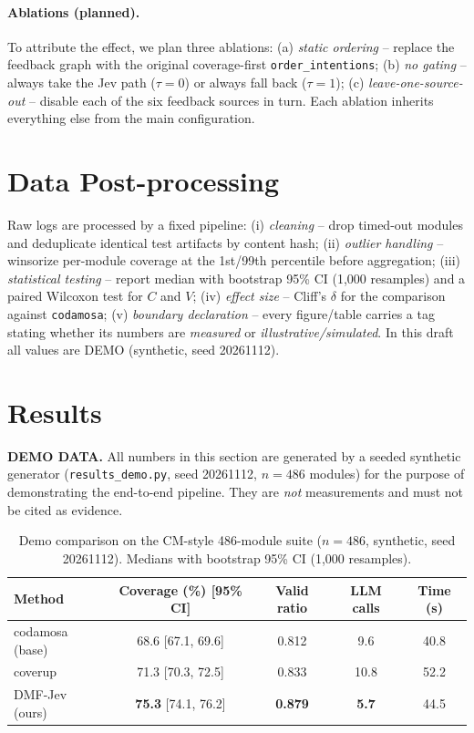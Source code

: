 \documentclass[11pt]{article}
\begin{document}
\paragraph{Ablations (planned).}
To attribute the effect, we plan three ablations: (a) \emph{static ordering} -- replace the feedback graph with the original coverage-first \texttt{order\_intentions}; (b) \emph{no gating} -- always take the Jev path ($\tau=0$) or always fall back ($\tau=1$); (c) \emph{leave-one-source-out} -- disable each of the six feedback sources in turn. Each ablation inherits everything else from the main configuration.

\section{Data Post-processing}
\label{sec:post}
Raw logs are processed by a fixed pipeline: (i) \emph{cleaning} -- drop timed-out modules and deduplicate identical test artifacts by content hash; (ii) \emph{outlier handling} -- winsorize per-module coverage at the 1st/99th percentile before aggregation; (iii) \emph{statistical testing} -- report median with bootstrap 95\% CI (1,000 resamples) and a paired Wilcoxon test for $C$ and $V$; (iv) \emph{effect size} -- Cliff's $\delta$ for the comparison against \texttt{codamosa}; (v) \emph{boundary declaration} -- every figure/table carries a tag stating whether its numbers are \emph{measured} or \emph{illustrative/simulated}. \textcolor{warn}{In this draft all values are DEMO (synthetic, seed 20261112).}

\section{Results}
\label{sec:results}
\textcolor{warn}{\textbf{DEMO DATA.} All numbers in this section are generated by a seeded synthetic
generator (\texttt{results\_demo.py}, seed 20261112, $n=486$ modules) for the purpose of
demonstrating the end-to-end pipeline. They are \emph{not} measurements and must not be cited as evidence.}
\begin{table}[h]
\centering
\caption{Demo comparison on the CM-style 486-module suite ($n=486$, synthetic, seed 20261112).
Medians with bootstrap 95\% CI (1,000 resamples).}
\label{tab:cm}
\begin{tabular}{lcccc}
\toprule
Method & Coverage (\%) [95\% CI] & Valid ratio & LLM calls & Time (s) \\
\midrule
codamosa (base) & 68.6 [67.1, 69.6] & 0.812 & 9.6 & 40.8 \\
coverup & 71.3 [70.3, 72.5] & 0.833 & 10.8 & 52.2 \\
DMF-Jev (ours) & \textbf{75.3} [74.1, 76.2] & \textbf{0.879} & \textbf{5.7} & 44.5 \\
\bottomrule
\end{tabular}
\end{table}
\end{document}
